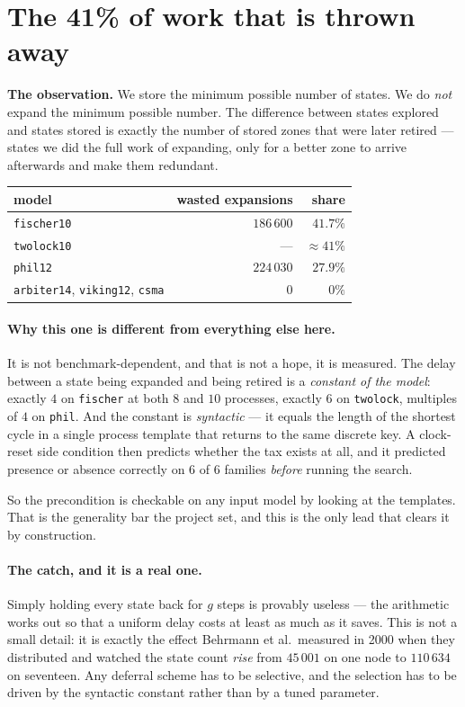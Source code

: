 \section{The 41\% of work that is thrown away \hfill \live{}}

\textbf{The observation.} We store the minimum possible number of states. We do \emph{not} expand
the minimum possible number. The difference between states explored and states stored is exactly
the number of stored zones that were later retired --- states we did the full work of expanding,
only for a better zone to arrive afterwards and make them redundant.

\begin{center}
\begin{tabular}{@{}lrr@{}}
\toprule
model & wasted expansions & share \\
\midrule
\texttt{fischer10} & $186\,600$ & $41.7\%$ \\
\texttt{twolock10} & --- & $\approx 41\%$ \\
\texttt{phil12}    & $224\,030$ & $27.9\%$ \\
\texttt{arbiter14}, \texttt{viking12}, \texttt{csma} & $0$ & $0\%$ \\
\bottomrule
\end{tabular}
\end{center}

\paragraph{Why this one is different from everything else here.} It is not benchmark-dependent, and
that is not a hope, it is measured. The delay between a state being expanded and being retired is a
\emph{constant of the model}: exactly $4$ on \texttt{fischer} at both $8$ and $10$ processes,
exactly $6$ on \texttt{twolock}, multiples of $4$ on \texttt{phil}. And the constant is
\emph{syntactic} --- it equals the length of the shortest cycle in a single process template that
returns to the same discrete key. A clock-reset side condition then predicts whether the tax exists
at all, and it predicted presence or absence correctly on $6$ of $6$ families \emph{before} running
the search.

So the precondition is checkable on any input model by looking at the templates. That is the
generality bar the project set, and this is the only lead that clears it by construction.

\paragraph{The catch, and it is a real one.} Simply holding every state back for $g$ steps is
provably useless --- the arithmetic works out so that a uniform delay costs at least as much as it
saves. This is not a small detail: it is exactly the effect Behrmann et al.\ measured in 2000 when
they distributed \uppaal{} and watched the state count \emph{rise} from $45\,001$ on one node to
$110\,634$ on seventeen. Any deferral scheme has to be selective, and the selection has to be
driven by the syntactic constant rather than by a tuned parameter.

